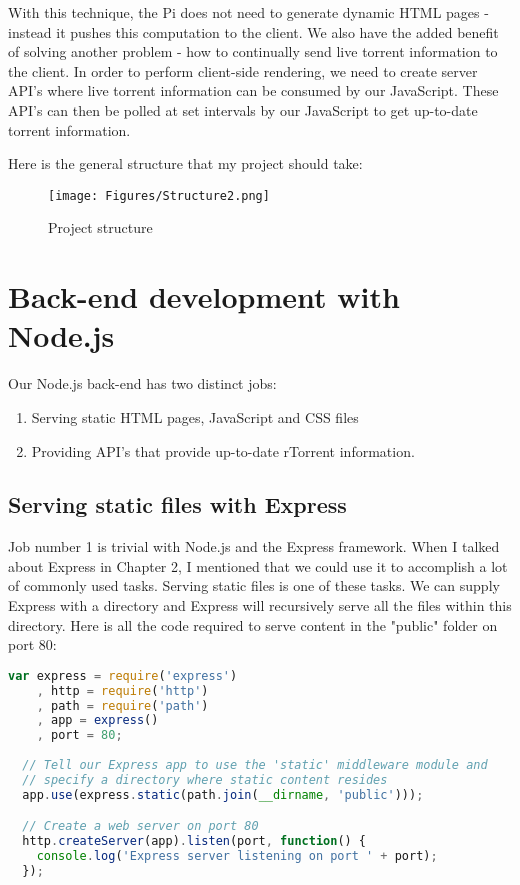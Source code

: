 With this technique, the Pi does not need to generate dynamic HTML pages - instead it pushes this computation to the client. We also have the added benefit of solving another problem - how to continually send live torrent information to the client. In order to perform client-side rendering, we need to create server API's where live torrent information can be consumed by our JavaScript. These API's can then be polled at set intervals by our JavaScript to get up-to-date torrent information.

Here is the general structure that my project should take:

\vspace{10px}
\begin{figure}[h!]
  \centering
    \texttt{[image: Figures/Structure2.png]}
  \caption{Project structure}
\end{figure}


\section{Back-end development with Node.js}
Our Node.js back-end has two distinct jobs:

\begin{enumerate}
	\item Serving static HTML pages, JavaScript and CSS files
	\item Providing API's that provide up-to-date rTorrent information.
\end{enumerate}

\subsection{Serving static files with Express}
Job number 1 is trivial with Node.js and the Express framework. When I talked about Express in Chapter 2, I mentioned that we could use it to accomplish a lot of commonly used tasks. Serving static files is one of these tasks. We can supply Express with a directory and Express will recursively serve all the files within this directory. Here is all the code required to serve content in the "public" folder on port 80:

\vspace{20px}
\begin{lstlisting}[caption=Express serving static files, language=JavaScript]
  var express = require('express')
    , http = require('http')
    , path = require('path')
    , app = express()
    , port = 80;
 
  // Tell our Express app to use the 'static' middleware module and
  // specify a directory where static content resides
  app.use(express.static(path.join(__dirname, 'public')));

  // Create a web server on port 80
  http.createServer(app).listen(port, function() {
    console.log('Express server listening on port ' + port);
  });
\end{lstlisting}

